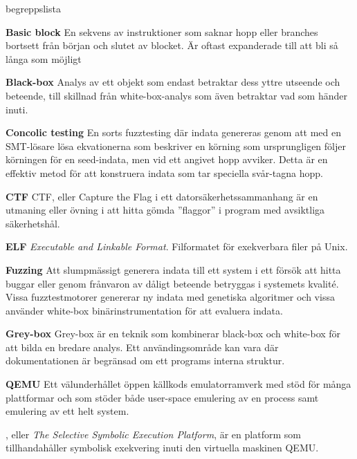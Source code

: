 \begin{labeling}{begreppslista}

    \item[\textbf{Basic block}] En sekvens av instruktioner som saknar
    hopp eller branches bortsett från början och slutet av
    blocket. Är oftast expanderade till att bli så långa som möjligt

    \item [\textbf{Black-box}] Analys av ett objekt som endast betraktar dess
    yttre utseende och beteende, till skillnad från white-box-analys som även
    betraktar vad som händer inuti.

    \item [\textbf{Concolic testing}] En sorts fuzztesting där indata genereras
    genom att med en SMT-lösare lösa ekvationerna som beskriver en körning som
    ursprungligen följer körningen för en seed-indata, men vid ett angivet
    hopp avviker. Detta är en effektiv metod för att konstruera indata som tar
    speciella svår-tagna hopp.

    \item [\textbf{CTF}] CTF, eller Capture the Flag i ett
    datorsäkerhetssammanhang är en utmaning eller övning i
    att hitta gömda ''flaggor'' i program med avsiktliga säkerhetshål.

    \item [\textbf{ELF}] \emph{Executable and Linkable Format}. Filformatet för
    exekverbara filer på Unix.

    \item [\textbf{Fuzzing}] Att slumpmässigt generera indata till ett system i
    ett försök att hitta buggar eller genom frånvaron av dåligt beteende
    betryggas i systemets kvalité. Vissa fuzztestmotorer genererar ny indata
    med genetiska algoritmer och vissa använder white-box binärinstrumentation
    för att evaluera indata.

    \item [\textbf{Grey-box}] Grey-box är en teknik som kombinerar black-box och
    white-box för att bilda en bredare analys. Ett användingsområde kan vara där
    dokumentationen är begränsad om ett programs interna struktur.

    \item [\textbf{QEMU}] Ett välunderhållet öppen källkods emulatorramverk med stöd
    för många plattformar och som stöder både user-space emulering av en process
    samt emulering av ett helt system.

    \item [\textbf{\stoe}] \stoe, eller \emph{The Selective Symbolic Execution Platform}, är
    en platform som tillhandahåller symbolisk exekvering inuti den virtuella
    maskinen QEMU.\@


\end{labeling}
